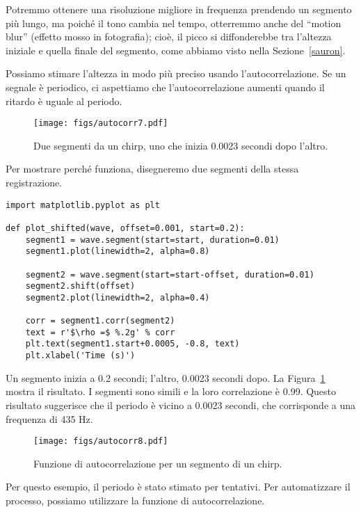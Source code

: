 \documentclass[12pt,a4paper]{book}
\begin{document}
Potremmo ottenere una risoluzione migliore in frequenza prendendo un segmento più lungo, ma poiché il tono cambia nel tempo, otterremmo anche del ``motion blur'' (effetto mosso in fotografia); cioè, il picco si diffonderebbe tra l'altezza iniziale e quella finale del segmento, come abbiamo visto nella Sezione~\ref{sauron}.

Possiamo stimare l'altezza in modo più preciso usando l'autocorrelazione. Se un segnale è periodico, ci aspettiamo che l'autocorrelazione aumenti quando il ritardo è uguale al periodo.

\begin{figure} 

\centerline{\texttt{[image: figs/autocorr7.pdf]}} \caption{Due segmenti da un chirp, uno che inizia 0.0023 secondi dopo l'altro.} \label{fig.autocorr7} \end{figure} 

Per mostrare perché funziona, disegneremo due segmenti della stessa registrazione.

\begin{verbatim} 
import matplotlib.pyplot as plt

def plot_shifted(wave, offset=0.001, start=0.2):
    segment1 = wave.segment(start=start, duration=0.01)
    segment1.plot(linewidth=2, alpha=0.8)

    segment2 = wave.segment(start=start-offset, duration=0.01)
    segment2.shift(offset)
    segment2.plot(linewidth=2, alpha=0.4)

    corr = segment1.corr(segment2)
    text = r'$\rho =$ %.2g' % corr
    plt.text(segment1.start+0.0005, -0.8, text)
    plt.xlabel('Time (s)')
 \end{verbatim} 

Un segmento inizia a 0.2 secondi; l'altro, 0.0023 secondi dopo. La Figura~\ref{fig.autocorr7} mostra il risultato. I segmenti sono simili e la loro correlazione è 0.99. Questo risultato suggerisce che il periodo è vicino a 0.0023 secondi, che corrisponde a una frequenza di 435 Hz.

\begin{figure} 

\centerline{\texttt{[image: figs/autocorr8.pdf]}} \caption{Funzione di autocorrelazione per un segmento di un chirp.} \label{fig.autocorr8} \end{figure} 

Per questo esempio, il periodo è stato stimato per tentativi. Per automatizzare il processo, possiamo utilizzare la funzione di autocorrelazione.
\end{document}
